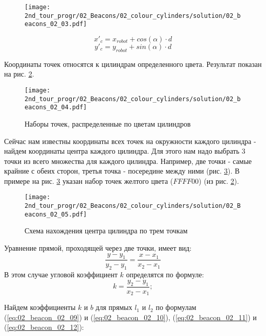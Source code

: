 \begin{figure}[h!]
	\centering
	\texttt{[image: 2nd\_tour\_progr/02\_Beacons/02\_colour\_cylinders/solution/02\_beacons\_02\_03.pdf]}
	\caption{}
	\label{fig:02_beacons_02_03}
\end{figure}

\begin{equation}
x'_c = x_{robot} + cos(\alpha) \cdot d
\label{eq:02_beacon_02_05}
\end{equation}
\begin{equation}
y'_c = y_{robot} + sin(\alpha) \cdot d
\label{eq:02_beacon_02_06}
\end{equation}

Координаты точек относятся к цилиндрам определенного цвета. Результат показан на рис. \ref{fig:02_beacons_02_04}.

\begin{figure}[h!]
	\centering
	\texttt{[image: 2nd\_tour\_progr/02\_Beacons/02\_colour\_cylinders/solution/02\_beacons\_02\_04.pdf]}
	\caption{Наборы точек, распределенные по цветам цилиндров}
	\label{fig:02_beacons_02_04}
\end{figure}


Сейчас нам известны координаты всех точек на окружности каждого цилиндра - найдем координаты центра каждого цилиндра.
Для этого нам надо выбрать 3 точки из всего множества для каждого цилиндра. Например, две точки - самые крайние с обеих сторон, третья точка - посередине между ними (рис. \ref{fig:02_beacons_02_05}). В примере на рис. \ref{fig:02_beacons_02_05} указан набор точек желтого цвета ($FFFF00$) (из рис. \ref{fig:02_beacons_02_04}).

\begin{figure}[h]
	\centering
	\texttt{[image: 2nd\_tour\_progr/02\_Beacons/02\_colour\_cylinders/solution/02\_Beacons\_02\_05.pdf]}
	\caption{Схема нахождения центра цилиндра по трем точкам}
	\label{fig:02_beacons_02_05}
\end{figure}

Уравнение прямой, проходящей через две точки, имеет вид:
\begin{equation*}
\frac{y-y_1}{y_2-y_1} = \frac{x-x_1}{x_2-x_1}
\end{equation*}
В этом случае угловой коэффициент $k$ определятся по формуле:
\begin{equation*}
k = \frac{y_2-y_1}{x_2-x_1};
\end{equation*}

Найдем коэффициенты $k$ и $b$ для прямых $l_1$ и $l_2$ по формулам (\ref{eq:02_beacon_02_09}) и (\ref{eq:02_beacon_02_10}), (\ref{eq:02_beacon_02_11}) и (\ref{eq:02_beacon_02_12}):


